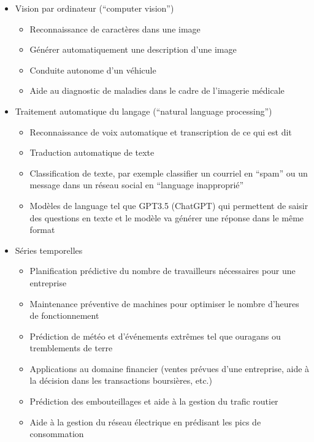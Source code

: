 \begin{itemize}
    \item Vision par ordinateur (``computer vision'')
    \begin{itemize}
        \item Reconnaissance de caractères dans une image
        \item Générer automatiquement une description d'une image
        \item Conduite autonome d'un véhicule
        \item Aide au diagnostic de maladies dans le cadre de l'imagerie médicale
    \end{itemize}
    
    \item Traitement automatique du langage (``natural language processing'')
    \begin{itemize}
        \item Reconnaissance de voix automatique et transcription de ce qui est dit
        \item Traduction automatique de texte
        \item Classification de texte, par exemple classifier un courriel en ``spam'' ou un message dans un réseau social en ``language inapproprié''
        \item Modèles de language tel que GPT3.5 (ChatGPT) qui permettent de saisir des questions en texte et le modèle va générer une réponse dans le même format
    \end{itemize}
    
    \item Séries temporelles
    \begin{itemize}
        \item Planification prédictive du nombre de travailleurs nécessaires pour une entreprise
        \item Maintenance préventive de machines pour optimiser le nombre d'heures de fonctionnement
        \item Prédiction de météo et d'événements extrêmes tel que ouragans ou tremblements de terre
        \item Applications au domaine financier (ventes prévues d'une entreprise, aide à la décision dans les transactions boursières, etc.)
        \item Prédiction des embouteillages et aide à la gestion du trafic routier
        \item Aide à la gestion du réseau électrique en prédisant les pics de consommation
    \end{itemize}
\end{itemize}

